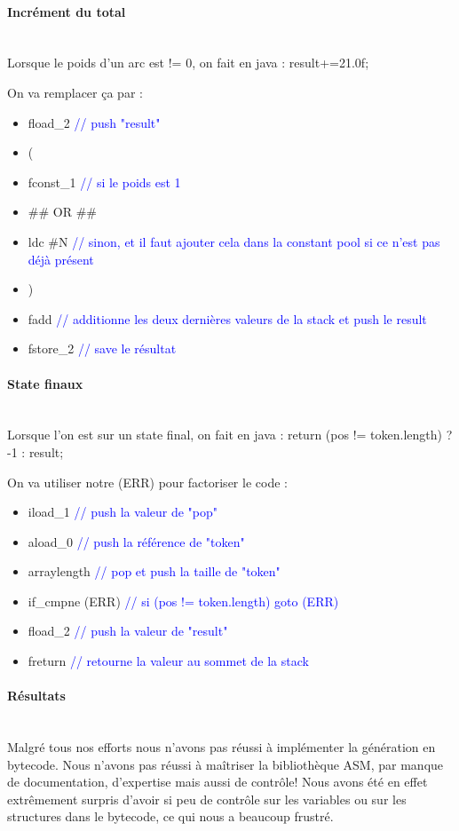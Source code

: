 \paragraph{Incrément du total}
~\\
Lorsque le poids d'un arc est != 0, on fait en java : result+=21.0f;

On va remplacer ça par :
\begin{itemize}
    \item[] fload\_2  \textcolor{blue}{// push "result"}
    \item[] (
    \item[] fconst\_1 \textcolor{blue}{// si le poids est 1}
    \item[] \#\# OR \#\#
    \item[] ldc \#N  \textcolor{blue}{// sinon, et il faut ajouter cela dans la constant pool si ce n'est pas déjà présent}
    \item[] )
    \item[] fadd  \textcolor{blue}{// additionne les deux dernières valeurs de la stack et push le result}
    \item[] fstore\_2 \textcolor{blue}{// save le résultat}
\end{itemize}

\paragraph{State finaux}
~\\
Lorsque l'on est sur un state final, on fait en java : return (pos != token.length) ? -1 : result;

On va utiliser notre (ERR) pour factoriser le code :
\begin{itemize}
    \item iload\_1  \textcolor{blue}{// push la valeur de "pop"}
    \item aload\_0  \textcolor{blue}{// push la référence de "token"}
    \item arraylength  \textcolor{blue}{// pop et push la taille de "token"}
    \item if\_cmpne (ERR) \textcolor{blue}{// si (pos != token.length) goto (ERR)}
    \item fload\_2  \textcolor{blue}{// push la valeur de "result"}
        \item freturn \textcolor{blue}{// retourne la valeur au sommet de la stack}
    \end{itemize}

\paragraph{Résultats}
~\\
Malgré tous nos efforts nous n'avons pas réussi à implémenter la génération en bytecode.
Nous n'avons pas réussi à maîtriser la bibliothèque ASM, par manque de documentation,
d'expertise mais aussi de contrôle! Nous avons été en effet extrêmement surpris d'avoir
si peu de contrôle sur les variables ou sur les structures dans le bytecode, ce qui
nous a beaucoup frustré.

